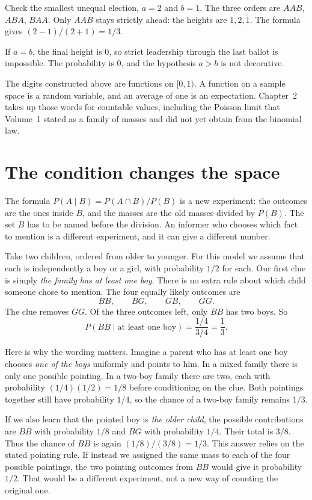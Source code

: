 Check the smallest unequal election, $a=2$ and $b=1$. The three orders are $AAB$, $ABA$, $BAA$. Only $AAB$ stays strictly ahead: the heights are $1,2,1$. The formula gives $(2-1)/(2+1)=1/3$.

If $a=b$, the final height is $0$, so strict leadership through the last ballot is impossible. The probability is $0$, and the hypothesis $a>b$ is not decorative.

The digits constructed above are functions on $[0,1)$. A function on a sample space is a random variable, and an average of one is an expectation. Chapter~2 takes up those words for countable values, including the Poisson limit that Volume~1 stated as a family of masses and did not yet obtain from the binomial law.

\section{The condition changes the space}

The formula $P(A\mid B)=P(A\cap B)/P(B)$ is a new experiment: the outcomes are the ones inside $B$, and the masses are the old masses divided by $P(B)$. The set $B$ has to be named before the division. An informer who chooses which fact to mention is a different experiment, and it can give a different number.

Take two children, ordered from older to younger. For this model we assume that each is independently a boy or a girl, with probability $1/2$ for each. Our first clue is simply \emph{the family has at least one boy}. There is no extra rule about which child someone chose to mention. The four equally likely outcomes are
\[
 BB,\qquad BG,\qquad GB,\qquad GG.
\]
The clue removes $GG$. Of the three outcomes left, only $BB$ has two boys. So
\[
 P(BB\mid\text{at least one boy})=\frac{1/4}{3/4}=\frac13.
\]

Here is why the wording matters. Imagine a parent who has at least one boy chooses \emph{one of the boys} uniformly and points to him. In a mixed family there is only one possible pointing. In a two-boy family there are two, each with probability $(1/4)(1/2)=1/8$ before conditioning on the clue. Both pointings together still have probability $1/4$, so the chance of a two-boy family remains $1/3$.

If we also learn that the pointed boy is \emph{the older child}, the possible contributions are $BB$ with probability $1/8$ and $BG$ with probability $1/4$. Their total is $3/8$. Thus the chance of $BB$ is again $(1/8)/(3/8)=1/3$. This answer relies on the stated pointing rule. If instead we assigned the same mass to each of the four possible pointings, the two pointing outcomes from $BB$ would give it probability $1/2$. That would be a different experiment, not a new way of counting the original one.

